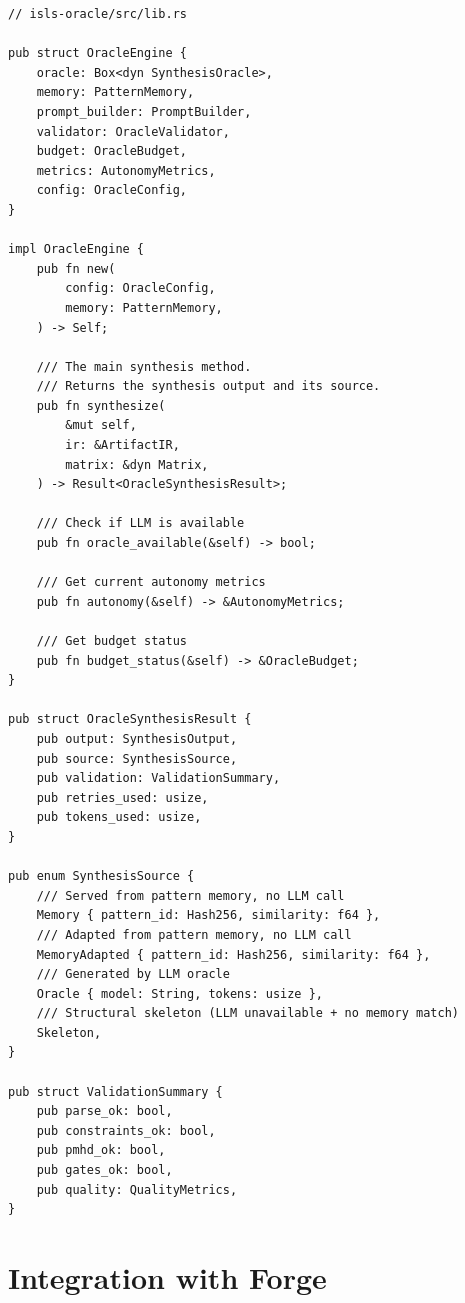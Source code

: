 \documentclass[11pt,a4paper,twoside]{article}
\theoremstyle{definition}
\theoremstyle{plain}
\theoremstyle{remark}
\begin{document}
\begin{lstlisting}
// isls-oracle/src/lib.rs

pub struct OracleEngine {
    oracle: Box<dyn SynthesisOracle>,
    memory: PatternMemory,
    prompt_builder: PromptBuilder,
    validator: OracleValidator,
    budget: OracleBudget,
    metrics: AutonomyMetrics,
    config: OracleConfig,
}

impl OracleEngine {
    pub fn new(
        config: OracleConfig,
        memory: PatternMemory,
    ) -> Self;

    /// The main synthesis method.
    /// Returns the synthesis output and its source.
    pub fn synthesize(
        &mut self,
        ir: &ArtifactIR,
        matrix: &dyn Matrix,
    ) -> Result<OracleSynthesisResult>;

    /// Check if LLM is available
    pub fn oracle_available(&self) -> bool;

    /// Get current autonomy metrics
    pub fn autonomy(&self) -> &AutonomyMetrics;

    /// Get budget status
    pub fn budget_status(&self) -> &OracleBudget;
}

pub struct OracleSynthesisResult {
    pub output: SynthesisOutput,
    pub source: SynthesisSource,
    pub validation: ValidationSummary,
    pub retries_used: usize,
    pub tokens_used: usize,
}

pub enum SynthesisSource {
    /// Served from pattern memory, no LLM call
    Memory { pattern_id: Hash256, similarity: f64 },
    /// Adapted from pattern memory, no LLM call
    MemoryAdapted { pattern_id: Hash256, similarity: f64 },
    /// Generated by LLM oracle
    Oracle { model: String, tokens: usize },
    /// Structural skeleton (LLM unavailable + no memory match)
    Skeleton,
}

pub struct ValidationSummary {
    pub parse_ok: bool,
    pub constraints_ok: bool,
    pub pmhd_ok: bool,
    pub gates_ok: bool,
    pub quality: QualityMetrics,
}
\end{lstlisting}


\section{Integration with Forge}\label{sec:forgeintegration}
\end{document}
